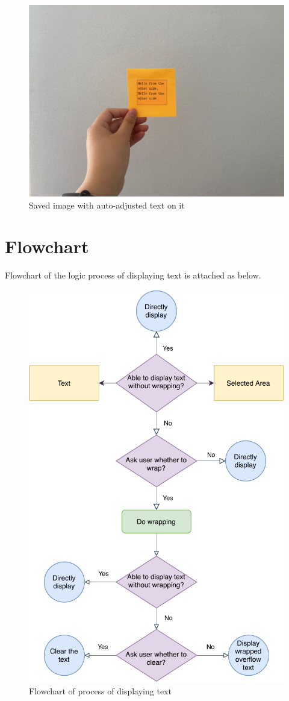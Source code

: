\documentclass[a4paper, twoside]{report}
\begin{document}
{\begin{itemize}
\begin{figure}[h!]
\centering
\includegraphics[width=.9\textwidth]{test.png}
\caption{Saved image with auto-adjusted text on it}
\end{figure}
\end{itemize}


\chapter{Flowchart}

\noindent Flowchart of the logic process of displaying text is attached as below.  \\ \par
\begin{figure}[h!]
\centering
\includegraphics[width=.7\textwidth]{project_flowchart.pdf}
\caption{Flowchart of process of displaying text}
\end{figure}
}
\end{document}

